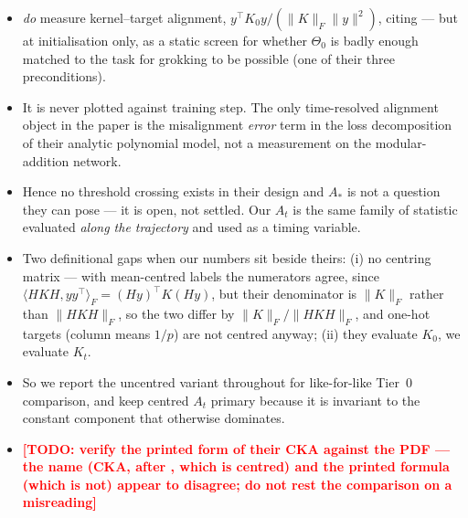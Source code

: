 \documentclass[a4paper,11pt]{article} %
\newcommand{\TODO}[1]{\textcolor{red}{\textbf{[TODO: #1]}}}
\newcommand{\Fnorm}[1]{\lVert #1 \rVert_F}
\newcommand{\Astar}{A_{*}}
\begin{document}
\begin{itemize}
	\item \citet[\S5]{kumar2024grokking} \emph{do} measure kernel--target
		alignment, $y^\top K_0y/(\Fnorm{K}\lVert y\rVert^2)$, citing
		\citet{kornblith2019cka} --- but at initialisation only, as a static screen
		for whether $\Theta_0$ is badly enough matched to the task for grokking to
		be possible (one of their three preconditions).
	\item It is never plotted against training step. The only time-resolved
		alignment object in the paper is the misalignment \emph{error} term in the
		loss decomposition of their analytic polynomial model, not a measurement on
		the modular-addition network.
	\item Hence no threshold crossing exists in their design and $\Astar$ is not a
		question they can pose --- it is open, not settled. Our $A_t$ is the same
		family of statistic evaluated \emph{along the trajectory} and used as a
		timing variable.
	\item Two definitional gaps when our numbers sit beside theirs:
		(i) no centring matrix --- with mean-centred labels the numerators agree,
		since $\langle HKH,yy^\top\rangle_F=(Hy)^\top K(Hy)$, but their denominator
		is $\Fnorm{K}$ rather than $\Fnorm{HKH}$, so the two differ by
		$\Fnorm{K}/\Fnorm{HKH}$, and one-hot targets (column means $1/p$) are not
		centred anyway; (ii) they evaluate $K_0$, we evaluate $K_t$.
	\item So we report the uncentred variant throughout for like-for-like Tier~0
		comparison, and keep centred $A_t$ \citep{cortes2012alignment} primary
		because it is invariant to the constant component that otherwise dominates.
	\item \TODO{verify the printed form of their CKA against the PDF --- the name
		(CKA, after \citeauthor{kornblith2019cka}, which is centred) and the printed
		formula (which is not) appear to disagree; do not rest the comparison on a
		misreading}
\end{itemize}
\end{document}
